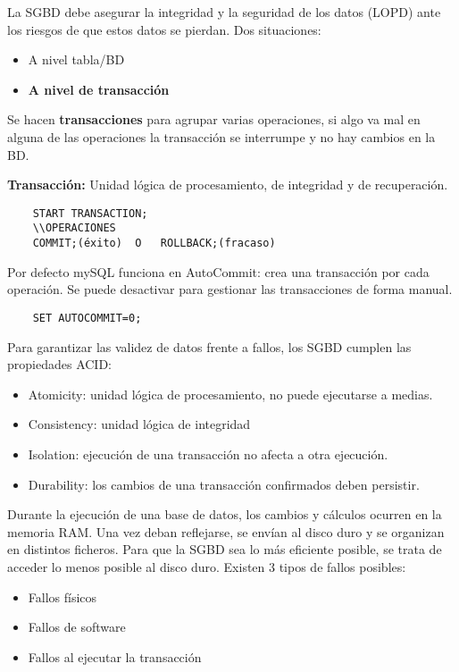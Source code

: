 \documentclass{article}
\begin{document}
La SGBD debe asegurar la integridad y la seguridad de los datos (LOPD) ante los riesgos de que estos datos se pierdan. 
Dos situaciones:
\begin{itemize}
	\item A nivel tabla/BD
	\item \textbf{A nivel de transacción}
\end{itemize}

Se hacen \textbf{transacciones} para agrupar varias operaciones, si algo va mal en alguna de las operaciones la transacción se interrumpe y no hay cambios en la BD. 
\begin{theorem}
    \textbf{Transacción:} Unidad lógica de procesamiento, de integridad y de recuperación. 
\end{theorem}

\begin{verbatim}
	START TRANSACTION;
	\\OPERACIONES
	COMMIT;(éxito)	O 	ROLLBACK;(fracaso)
\end{verbatim}
Por defecto mySQL funciona en AutoCommit: crea una transacción por cada operación. Se puede desactivar para gestionar las transacciones de forma manual.
\begin{verbatim}
	SET AUTOCOMMIT=0;
\end{verbatim}
Para garantizar las validez de datos frente a fallos, los SGBD cumplen las propiedades ACID:
\begin{itemize}
	\item Atomicity: unidad lógica de procesamiento, no puede ejecutarse a medias.
	\item Consistency: unidad lógica de integridad
	\item Isolation: ejecución de una transacción no afecta a otra ejecución.
	\item Durability: los cambios de una transacción confirmados deben persistir.
\end{itemize}
Durante la ejecución de una base de datos, los cambios y cálculos ocurren en la memoria RAM. Una vez deban reflejarse, se envían al disco duro y se organizan en distintos ficheros. Para que la SGBD sea lo más eficiente posible, se trata de acceder lo menos posible al disco duro. 
Existen 3 tipos de fallos posibles:
\begin{itemize}
	\item Fallos físicos
	\item Fallos de software
	\item Fallos al ejecutar la transacción
\end{itemize}
\end{document}
